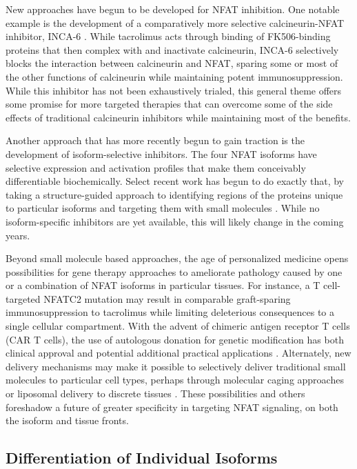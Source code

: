 New approaches have begun to be developed for NFAT inhibition. One notable example is the development of a comparatively more selective calcineurin-NFAT inhibitor, INCA-6 \citep{Roehrl2004}. While tacrolimus acts through binding of FK506-binding proteins that then complex with and inactivate calcineurin, INCA-6 selectively blocks the interaction between calcineurin and NFAT, sparing some or most of the other functions of calcineurin while maintaining potent immunosuppression. While this inhibitor has not been exhaustively trialed, this general theme offers some promise for more targeted therapies that can overcome some of the side effects of traditional calcineurin inhibitors while maintaining most of the benefits. 

Another approach that has more recently begun to gain traction is the development of isoform-selective inhibitors. The four NFAT isoforms have selective expression and activation profiles that make them conceivably differentiable biochemically. Select recent work has begun to do exactly that, by taking a structure-guided approach to identifying regions of the proteins unique to particular isoforms and targeting them with small molecules \citep{Kitamura2021}. While no isoform-specific inhibitors are yet available, this will likely change in the coming years.

Beyond small molecule based approaches, the age of personalized medicine opens possibilities for gene therapy approaches to ameliorate pathology caused by one or a combination of NFAT isoforms in particular tissues. For instance, a T cell-targeted NFATC2 mutation may result in comparable graft-sparing immunosuppression to tacrolimus while limiting deleterious consequences to a single cellular compartment. With the advent of chimeric antigen receptor T cells (CAR T cells), the use of autologous donation for genetic modification has both clinical approval and potential additional practical applications \citep{June2007}. Alternately, new delivery mechanisms may make it possible to selectively deliver traditional small molecules to particular cell types, perhaps through molecular caging approaches or liposomal delivery to discrete tissues \citep{Mukhtar2020, Hu2019}. These possibilities and others foreshadow a future of greater specificity in targeting NFAT signaling, on both the isoform and tissue fronts. 

\subsection{Differentiation of Individual Isoforms}\label{diffnfat}


